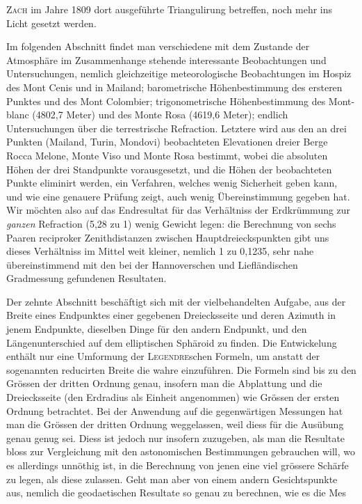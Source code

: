 %
\textsc{Zach} im Jahre 1809 dort ausgeführte Triangulirung betreffen, noch mehr ins Licht gesetzt werden.

Im folgenden Abschnitt findet man verschiedene mit dem Zustande der Atmosphäre im Zusammenhange stehende interessante Beobachtungen und Untersuchungen, nemlich gleichzeitige meteorologische Beobachtungen im Hospiz des Mont Cenis und in Mailand; barometrische Höhenbestimmung des ersteren Punktes und des Mont Colombier; trigonometrische Höhenbestimmung des Mont-blanc (4802,7 Meter) und des Monte Rosa (4619,6 Meter); endlich Untersuchungen über die terrestrische Refraction. Letztere wird aus den an drei Punkten (Mailand, Turin, Mondovi) beobachteten Elevationen dreier Berge Rocca Melone, Monte Viso und Monte Rosa bestimmt, wobei die absoluten Höhen der drei Standpunkte vorausgesetzt, und die Höhen der beobachteten Punkte eliminirt werden, ein Verfahren, welches wenig Sicherheit geben kann, und wie eine genauere Prüfung zeigt, auch wenig Übereinstimmung gegeben hat. Wir möchten also auf das Endresultat für das Verhältniss der Erdkrümmung zur \textit{ganzen} Refraction (5,28 zu 1) wenig Gewicht legen: die Berechnung von sechs Paaren reciproker Zenithdistanzen zwischen Hauptdreieckspunkten gibt uns dieses Verhältniss im Mittel weit kleiner, nemlich 1 zu 0,1235, sehr nahe übereinstimmend mit den bei der Hannoverschen und Liefländischen Gradmessung gefundenen Resultaten.

Der zehnte Abschnitt beschäftigt sich mit der vielbehandelten Aufgabe, aus der Breite eines Endpunktes einer gegebenen Dreiecksseite und deren Azimuth in jenem Endpunkte, dieselben Dinge für den andern Endpunkt, und den Längenunterschied auf dem elliptischen Sphäroid zu finden. Die Entwickelung enthält nur eine Umformung der \textsc{Legendre}schen Formeln, um anstatt der sogenannten reducirten Breite die wahre einzuführen. Die Formeln sind bis zu den Grössen der dritten Ordnung genau, insofern man die Abplattung und die Dreiecksseite (den Erdradius als Einheit angenommen) wie Grössen der ersten Ordnung betrachtet. Bei der Anwendung auf die gegenwärtigen Messungen hat man die Grössen der dritten Ordnung weggelassen, weil diess für die Ausübung genau genug sei. Diess ist jedoch nur insofern zuzugeben, als man die Resultate bloss zur Vergleichung mit den astonomischen Bestimmungen gebrauchen will, wo es allerdings unnöthig ist, in die Berechnung von jenen eine viel grössere Schärfe zu legen, als diese zulassen. Geht man aber von einem andern Gesichtspunkte aus, nemlich die geodaetischen Resultate so genau zu berechnen, wie es die Mes%
